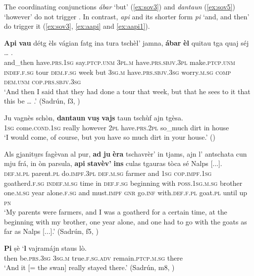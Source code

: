 The coordinating conjunctions \textit{ábar} `but' (\ref{ex:sov3}) and \textit{dantaun} (\ref{ex:sov5}) `however' do not trigger . In contrast, \textit{api} and its shorter form \textit{pi} `and, and then' do trigger it (\ref{ex:sov3}, \ref{ex:aapi} and \ref{ex:aapi1}).

\ea
\label{ex:sov3}
\gll \textbf{Api} \textbf{vau} détg èls vágian fatg ina tura tschèl’ jamna, \textbf{ábar} \textbf{èl}  quitau tga quaj séj … .\\  
and\_then have.\textsc{prs.1sg} say.\textsc{ptcp.unm} \textsc{3pl.m} have.\textsc{prs.sbjv.3pl} make.\textsc{ptcp.unm} \textsc{indef.f.sg} tour  \textsc{dem.f.sg} week but \textsc{3sg.m} have.\textsc{prs.sbjv.3sg} worry.\textsc{m.sg} \textsc{comp} \textsc{dem.unm} \textsc{cop.prs.sbjv.3sg} \\
\glt `And then I said that they had done a tour that week, but that he sees to it that this be … .' (Sadrún, f3, )
\z

\ea\label{ex:sov5}
\gll    Ju vagnès schòn, \textbf{dantaun} \textbf{vuṣ} \textbf{vajs} taun tschùf ajn tgèsa.\\
\textsc{1sg} come.\textsc{cond.1sg} really however \textsc{2pl} have.\textsc{prs.2pl} so\_much dirt in house\\
\glt `I would come, of course, but you have so much dirt in your house.' (\citealt[18]{Berther1998})
\z

\ea
\label{ex:aapi}
\gll    Als gjanitu̱rs fagèvan al pur, \textbf{ad} \textbf{ju} \textbf{èra} tschavrèr’ in tjams, ajn l’ antschata cun mju frá, in òn parsula, \textbf{api} \textbf{stavèv’} \textbf{ins}  culas tgauras tòca sé Nalps [...]. \\
\textsc{def.m.pl} parent.\textsc{pl} do.\textsc{impf.3pl} \textsc{def.m.sg} farmer and \textsc{1sg} \textsc{cop.impf.1sg} goatherd.\textsc{f.sg} \textsc{indef.m.sg} time in \textsc{def.f.sg} beginning with \textsc{poss.1sg.m.sg} brother one.\textsc{m.sg} year alone.\textsc{f.sg}  and  must.\textsc{impf} \textsc{gnr} go.\textsc{inf} with.\textsc{def.f.pl} goat.\textsc{pl} until up  \textsc{pn} \\
\glt `My parents were farmers, and I was a goatherd for a certain time, at the beginning with my brother, one year alone, and one had to go with the goats as far as Nalps [...].' (Sadrún, f5, )
\z

\ea
\label{ex:aapi1}
	\gll   \textbf{Pi} ṣè `\textbf{l} vajramájn staus lò. \\
	then be.\textsc{prs.3sg} \textsc{3sg.m} true.\textsc{f.sg.adv} remain.\textsc{ptcp.m.sg} there\\
\glt `And it [= the swan] really stayed there.' (Sadrún, m8, )
\z

